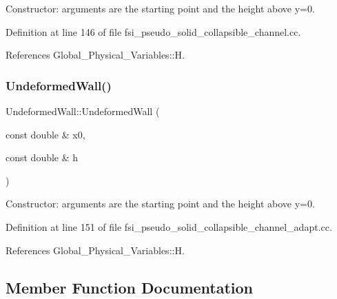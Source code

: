 Constructor\+: arguments are the starting point and the height above y=0. 



Definition at line 146 of file fsi\+\_\+pseudo\+\_\+solid\+\_\+collapsible\+\_\+channel.\+cc.



References Global\+\_\+\+Physical\+\_\+\+Variables\+::H.

\mbox{\label{classUndeformedWall_ad09cfdcd234be0ab47eb97a8a470602a}} 
\subsubsection{\texorpdfstring{Undeformed\+Wall()}{UndeformedWall()}\hspace{0.1cm}{\footnotesize\ttfamily [4/4]}}
{\footnotesize\ttfamily Undeformed\+Wall\+::\+Undeformed\+Wall (\begin{DoxyParamCaption}\item[{const double \&}]{x0,  }\item[{const double \&}]{h }\end{DoxyParamCaption})\hspace{0.3cm}{\ttfamily [inline]}}



Constructor\+: arguments are the starting point and the height above y=0. 



Definition at line 151 of file fsi\+\_\+pseudo\+\_\+solid\+\_\+collapsible\+\_\+channel\+\_\+adapt.\+cc.



References Global\+\_\+\+Physical\+\_\+\+Variables\+::H.



\subsection{Member Function Documentation}
\mbox{\label{classUndeformedWall_a709e65fc95e9443a886125e455595e5d}} 
